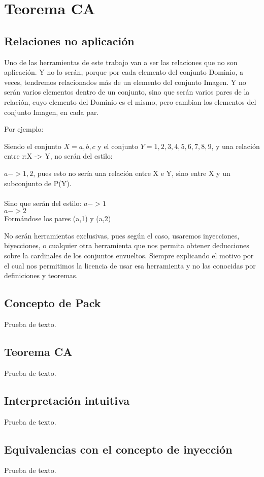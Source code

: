 \chapter{Teorema CA}

\newpage
\section{Relaciones no aplicación}
Uno de las herramientas de este trabajo van a ser las relaciones que no son aplicación. Y no lo serán, porque por cada elemento del conjunto Dominio, a veces, tendremos relacionados más de un elemento del conjunto Imagen. Y no serán varios elementos dentro de un conjunto, sino que serán varios pares de la relación, cuyo elemento del Dominio es el mismo, pero cambian los elementos del conjunto Imagen, en cada par.

Por ejemplo:

Siendo el conjunto $X={a,b,c}$ y el conjunto $Y={1,2,3,4,5,6,7,8,9}$, y una relación entre r:X -> Y, no serán del estilo: 

$a -> {1,2}$, pues esto no sería una relación entre X e Y, sino entre X y un subconjunto de P(Y).\\\\

\noindent Sino que serán del estilo:
$a-> 1$\\
$a-> 2$\\

Formándose los pares (a,1) y (a,2)

No serán herramientas exclusivas, pues según el caso, usaremos inyecciones, biyecciones, o cualquier otra herramienta que nos permita obtener deducciones sobre la cardinales de los conjuntos envueltos. Siempre explicando el motivo por el cual nos permitimos la licencia de usar esa herramienta y no las conocidas por definiciones y teoremas. 

\newpage
\section{Concepto de Pack}
Prueba de texto.

\newpage
\section{Teorema CA}
Prueba de texto.

\newpage
\section{Interpretación intuitiva}
Prueba de texto.

\newpage
\section{Equivalencias con el concepto de inyección}
Prueba de texto.